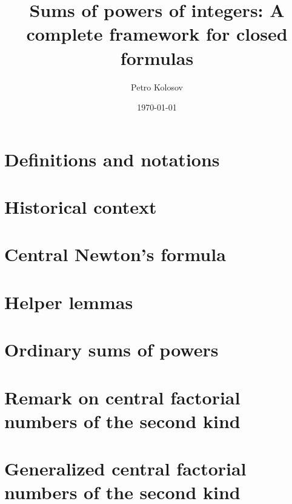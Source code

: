 \documentclass[12pt,letterpaper,oneside,reqno]{amsart}
\title[Sums of powers of integers: A complete framework for closed formulas]
{Sums of powers of integers: A complete framework for closed formulas}
\author[Petro Kolosov]{Petro Kolosov}
\date{\today}
\let\svthefootnote\thefootnote
\newcommand\freefootnote[1]{%
  \let\thefootnote\relax%
  \footnotetext{#1}%
  \let\thefootnote\svthefootnote%
}
\begin{document}
\begin{abstract}
  
\end{abstract}

\maketitle





% 

\section{Definitions and notations}


\section{Historical context}


\section{Central Newton's formula}


\section{Helper lemmas}


\section{Ordinary sums of powers}


\section{Remark on central factorial numbers of the second kind}


\section{Generalized central factorial numbers of the second kind}

\end{document}

